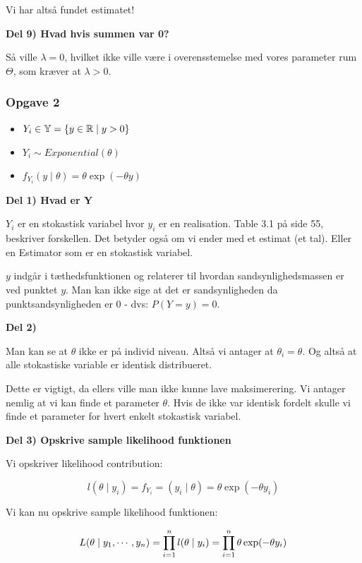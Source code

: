Vi har altså fundet estimatet!

\textbf{Del 9) Hvad hvis summen var 0?}

Så ville $\lambda = 0$, hvilket ikke ville være i overensstemelse med vores parameter rum $\Theta$, som kræver at $\lambda > 0$.

\subsubsection{Opgave 2}

\begin{itemize}
    \item $Y_i \in \mathbb{Y} = \left\{ y \in \mathbb{R} \mid y > 0\right\}$
    \item $Y_i \sim Exponential(\theta)$
    \item $f_{Y_i} (y \mid \theta) = \theta \exp (- \theta y)$
\end{itemize}

\textbf{Del 1) Hvad er Y}

$Y_i$ er en stokastisk variabel hvor $y_i$ er en realisation. Table 3.1 på side 55, beskriver forskellen. Det betyder også om vi ender med et estimat (et tal). Eller en Estimator som er en stokastisk variabel.

$y$ indgår i tæthedsfunktionen og relaterer til hvordan sandsynlighedsmassen er ved punktet $y$. Man kan ikke sige at det er sandsynligheden da punktsandsynligheden er 0 - dvs: $P(Y=y) = 0$.

\textbf{Del 2)}

Man kan se at $\theta$ ikke er på individ niveau. Altså vi antager at $\theta_i = \theta$. Og altså at alle stokastiske variable er identisk distribueret.

Dette er vigtigt, da ellers ville man ikke kunne lave maksimerering. Vi antager nemlig at vi kan finde et parameter $\theta$. Hvis de ikke var identisk fordelt skulle vi finde et parameter for hvert enkelt stokastisk variabel.

\textbf{Del 3) Opskrive sample likelihood funktionen}

Vi opskriver likelihood contribution:

\begin{equation}
    l(\theta \mid y_i) = f_{Y_i} = (y_i \mid \theta) = \theta \exp (-\theta y_i)
\end{equation}

Vi kan nu opskrive sample likelihood funktionen:

\begin{equation}
    L(\theta \mid y_1,  \cdots , y_n ) = \prod_{i=1}^{n} l(\theta \mid y_i) = \prod_{i=1}^{n} \theta \exp (-\theta y_i)
\end{equation}

